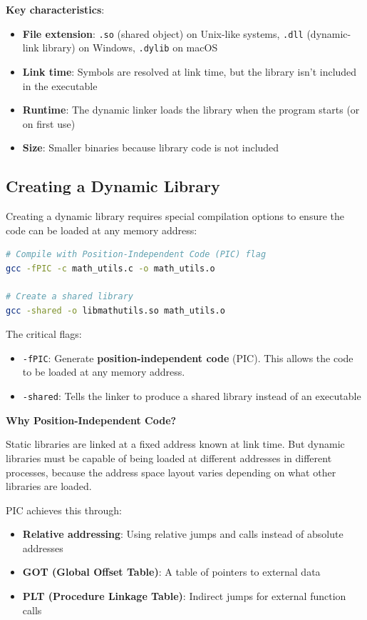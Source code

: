 \textbf{Key characteristics}:
\begin{itemize}
    \item \textbf{File extension}: \texttt{.so} (shared object) on Unix-like systems, \texttt{.dll} (dynamic-link library) on Windows, \texttt{.dylib} on macOS
    \item \textbf{Link time}: Symbols are resolved at link time, but the library isn't included in the executable
    \item \textbf{Runtime}: The dynamic linker loads the library when the program starts (or on first use)
    \item \textbf{Size}: Smaller binaries because library code is not included
\end{itemize}

\subsection{Creating a Dynamic Library}

Creating a dynamic library requires special compilation options to ensure the code can be loaded at any memory address:

\begin{lstlisting}[language=bash]
# Compile with Position-Independent Code (PIC) flag
gcc -fPIC -c math_utils.c -o math_utils.o

# Create a shared library
gcc -shared -o libmathutils.so math_utils.o
\end{lstlisting}

The critical flags:
\begin{itemize}
    \item \texttt{-fPIC}: Generate \textbf{position-independent code} (PIC). This allows the code to be loaded at any memory address.
    \item \texttt{-shared}: Tells the linker to produce a shared library instead of an executable
\end{itemize}

\textbf{Why Position-Independent Code?}

Static libraries are linked at a fixed address known at link time. But dynamic libraries must be capable of being loaded at different addresses in different processes, because the address space layout varies depending on what other libraries are loaded.

PIC achieves this through:
\begin{itemize}
    \item \textbf{Relative addressing}: Using relative jumps and calls instead of absolute addresses
    \item \textbf{GOT (Global Offset Table)}: A table of pointers to external data
    \item \textbf{PLT (Procedure Linkage Table)}: Indirect jumps for external function calls
\end{itemize}

